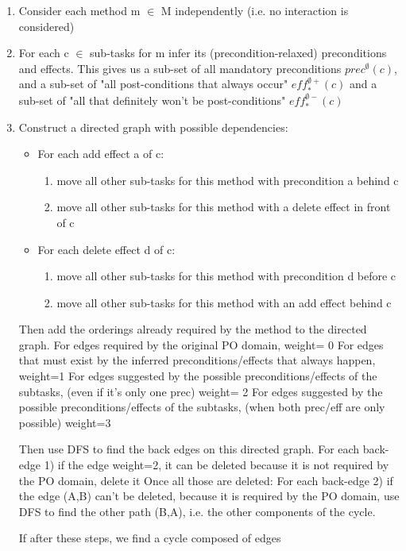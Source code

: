 % 
\begin{enumerate}
	\item Consider each method m $\in$ M independently (i.e. no interaction is considered)
	\item For each c $\in$ sub-tasks for m infer its (precondition-relaxed) preconditions and effects.
	This gives us a sub-set of all mandatory preconditions $prec^{\emptyset}(c)$,
	and a sub-set of "all post-conditions that always occur" $eff^{\emptyset +}_{*}(c)$ 
	and a sub-set of "all that definitely won't be post-conditions" $eff^{\emptyset -}_{*}(c)$
	
	\item Construct a directed graph with possible dependencies:  
	\begin{itemize}
		\item For each add effect a of c:
		\begin{enumerate} 
			\item move all other sub-tasks for this method with precondition a behind c 
			\item move all other sub-tasks for this method with a delete effect in front of c
		\end{enumerate}
		\item For each delete effect d of c:
		\begin{enumerate} 
			\item move all other sub-tasks for this method with precondition d before c %
			\item move all other sub-tasks for this method with an add effect behind c 
		\end{enumerate}
	\end{itemize}
	Then add the orderings already required by the method to the directed graph.
	For edges required by the original PO domain, weight= 0 \newline
	For edges that must exist by the inferred preconditions/effects that always happen, weight=1 \newline 
	For edges suggested by the possible preconditions/effects of the subtasks,
	(even if it's only one prec) weight= 2 \newline
	For edges suggested by the possible preconditions/effects of the subtasks,
	(when both prec/eff are only possible) weight=3 \newline
	
	Then use DFS to find the back edges on this directed graph.
	For each back-edge 
	1) if the edge weight=2, it can be deleted because it is not required by the PO domain, delete it
	Once all those are deleted:
	For each back-edge 
	2) if the edge (A,B) can't be deleted, because it is required by the PO domain, use DFS to find the other path (B,A),
	i.e. the other components of the cycle.
	
	If after these steps, we find a cycle composed of edges
\end{enumerate}

